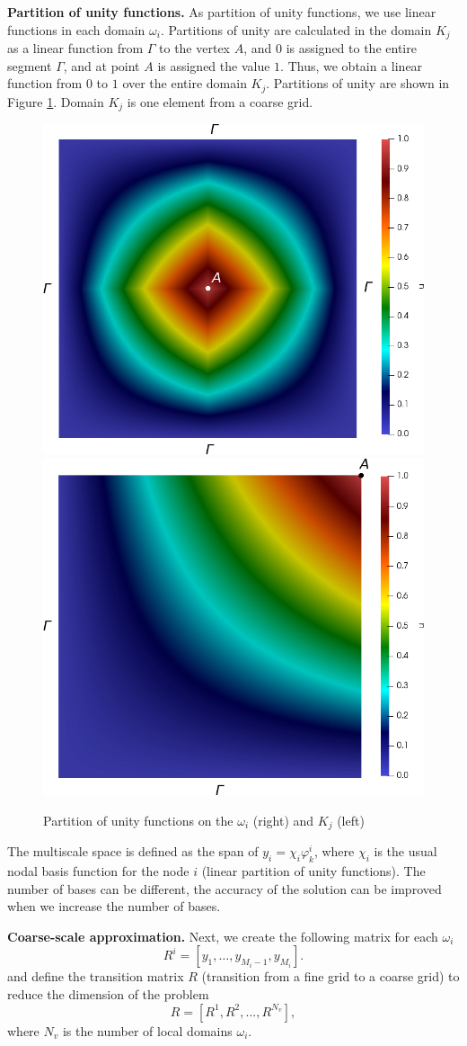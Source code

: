 \documentclass[runningheads]{llncs}
\begin{document}
\textbf{Partition of unity functions. } As  partition of unity functions, we use linear functions in each domain $\omega_i$.
Partitions of unity are calculated in the domain $ K_j $ as a linear function from $\Gamma$ to the vertex $ A $, and $ 0 $ is assigned to the entire segment $\Gamma$, and at point $ A $ is assigned the value $1$. 
Thus, we obtain a linear function from $ 0 $ to $ 1 $ over the entire domain $ K_j $. 
Partitions of unity are shown in Figure \ref{p2}. 
Domain $K_j$  is one element from a coarse grid. 
\begin{figure}[h!]
\centering
\includegraphics[width=0.45\linewidth]{pofs.png} 
\hspace{2em}
\includegraphics[width=0.45\linewidth]{pouK.png} 
\caption{Partition of unity functions on the $\omega_i$ (right) and $K_j$ (left)}
\label{p2}
\end{figure} 
 
The multiscale space is defined as the span of $y_i = \chi_i \varphi^i_k$, where $\chi_i$ is the usual nodal basis function for the node $i$ (linear partition of unity functions). 
The number of bases can be different, the accuracy of the solution can be improved when we increase the number of bases.

\textbf{Coarse-scale approximation. }
Next, we create the following  matrix for each $\omega_i$
\[
R^i = \left[ y_1, \ldots, y_{M_i-1},  y_{M_i} \right].
\]
and define the transition matrix $R$ (transition from a fine grid to a coarse grid) to reduce the dimension of the problem
\[
R = [ R^1, R^2, ..., R^{N_v} ],
\]
where $N_v$ is the number of local domains $\omega_i$.
\end{document}
